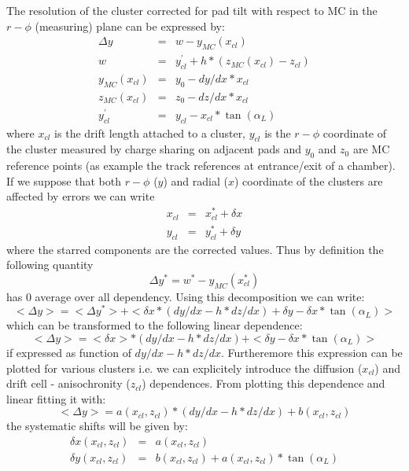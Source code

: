 \documentclass{alicetdr}
\begin{document}
The resolution of the cluster corrected for pad tilt with respect to MC in the
$r-\phi$ (measuring) plane can be expressed by:
\begin{eqnarray}
\Delta y&=&w - y_{MC}(x_{cl})\\
w &=& y_{cl}^{'} + h*(z_{MC}(x_{cl})-z_{cl})\\
y_{MC}(x_{cl}) &=& y_{0} - dy/dx*x_{cl}\\
z_{MC}(x_{cl}) &=& z_{0} - dz/dx*x_{cl}\\
y_{cl}^{'} &=& y_{cl}-x_{cl}*\tan(\alpha_{L})
\end{eqnarray}
where $x_{cl}$ is the drift length attached to a cluster, $y_{cl}$ is the
$r-\phi$ coordinate of the cluster measured by charge sharing on adjacent pads
and $y_0$ and $z_0$ are MC reference points (as example the track references at
entrance/exit of a chamber). If we suppose that both $r-\phi$ ($y$) and radial
($x$) coordinate of the clusters are affected by errors we can write
\begin{eqnarray}
x_{cl} &=& x_{cl}^{*} + \delta x\\
y_{cl} &=& y_{cl}^{*} + \delta y
\end{eqnarray}
where the starred components are the corrected values. Thus by definition the
following quantity
\begin{equation}
\Delta y^{*}= w^{*} - y_{MC}(x_{cl}^{*})
\end{equation}
has 0 average over all dependency. Using this decomposition we can write:
\begin{equation}\label{EQ_CLUSTER:shift}
<\Delta y>=<\Delta y^{*}> + <\delta x * (dy/dx-h*dz/dx) + \delta y - \delta x
          * \tan(\alpha_{L})>
\end{equation}
which can be transformed to the following linear dependence:
\begin{equation}
<\Delta y>= <\delta x> * (dy/dx-h*dz/dx) + <\delta y - \delta x * \tan(\alpha_{L})>
\end{equation}
if expressed as function of $dy/dx-h*dz/dx$. Furtheremore this expression can
be plotted for various clusters i.e. we can explicitely introduce the diffusion
($x_{cl}$) and drift cell - anisochronity ($z_{cl}$) dependences. From
plotting this dependence and linear fitting it with:
\begin{equation}
<\Delta y>= a(x_{cl}, z_{cl}) * (dy/dx-h*dz/dx) + b(x_{cl}, z_{cl})
\end{equation}
the systematic shifts will be given by:
\begin{eqnarray}
\delta x (x_{cl}, z_{cl}) &=& a(x_{cl}, z_{cl})\\
\delta y (x_{cl}, z_{cl}) &=& b(x_{cl}, z_{cl}) + a(x_{cl}, z_{cl}) * \tan(\alpha_{L})
\end{eqnarray}
\end{document}
